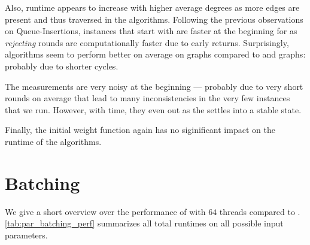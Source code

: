 Also, runtime appears to increase with higher average degrees as more edges are present and thus traversed in the algorithms.
Following the previous observations on Queue-Insertions, instances that start with \wzero are faster at the beginning for \algbf as \emph{rejecting} rounds are computationally faster due to early returns.
Surprisingly, algorithms seem to perform better on average on \rhg graphs compared to \gnp and \dsf graphs: probably due to shorter cycles.

The measurements are very noisy at the beginning --- probably due to very short rounds on average that lead to many inconsistencies in the very few instances that we run.
However, with time, they even out as the \markov settles into a stable state.

Finally, the initial weight function again has no siginificant impact on the runtime of the algorithms.


\section{Batching}\label{sec:exp_batch}
We give a short overview over the performance of \algbt with $64$ threads compared to \algbp.
\cref{tab:par_batching_perf} summarizes all total runtimes on all possible input parameters.

